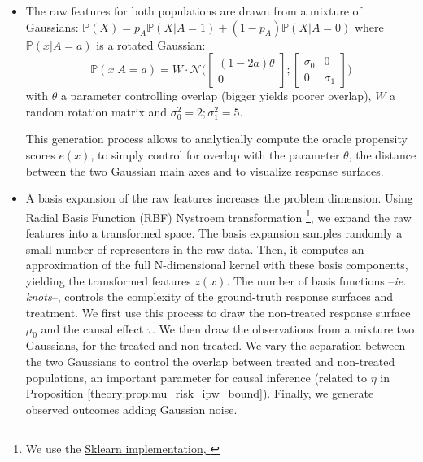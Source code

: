 \documentclass[11pt]{article}
\let\cite=\supercite
\begin{document}
\begin{itemize}
    \item The raw features for both populations are drawn from a mixture of
          Gaussians:
          $\mathbb P(X) = p_A \mathbb P(X|A=1) + (1- p_A) \mathbb P(X|A=0)$
          where $\mathbb P(x|A=a)$ is a rotated Gaussian:
          \begin{equation}
              \mathbb P(x|A=a) = W \cdot \mathcal N \Big( \begin{bmatrix} (1-2a) \theta \\ 0\end{bmatrix} ; \begin{bmatrix} \sigma_0 & 0 \\ 0 & \sigma_1\end{bmatrix} \Big)
          \end{equation}
          with $\theta$ a parameter controlling overlap (bigger yields poorer
          overlap), $W$ a random rotation matrix and $\sigma_0^2=2;\sigma_1^2=5$.

          This generation process allows to analytically compute the oracle
          propensity scores $e(x)$, to simply control for overlap with the
          parameter $\theta$, the distance between the two Gaussian main axes and
          to  visualize response surfaces.

    \item A basis expansion of the raw features increases the problem dimension.
          Using Radial Basis Function (RBF) Nystroem transformation \footnote{We
              use the
              \href{https://scikit-learn.org/stable/modules/generated/sklearn.kernel_approximation.Nystroem.html}{Sklearn
                  implementation, \cite{pedregosa_scikitlearn_2011}}}, we expand the raw
          features into a transformed space. The basis expansion samples
          randomly a small number of representers in the raw data. Then,  it
          computes an approximation of the full N-dimensional kernel with these
          basis components, yielding the transformed features $z(x)$. The number
          of basis functions --\emph{ie. knots}--, controls the complexity of
          the ground-truth response surfaces and treatment. We first use this
          process to draw the non-treated response surface $\mu_0$ and the
          causal effect $\tau$. We then draw the observations from a mixture two
          Gaussians, for the treated and non treated. We vary the separation
          between the two Gaussians to control the overlap between treated and
          non-treated populations, an important parameter for causal inference
          (related to $\eta$ in Proposition
          \ref{theory:prop:mu_risk_ipw_bound}). Finally, we generate observed
          outcomes adding Gaussian noise.


\end{itemize}
\end{document}
